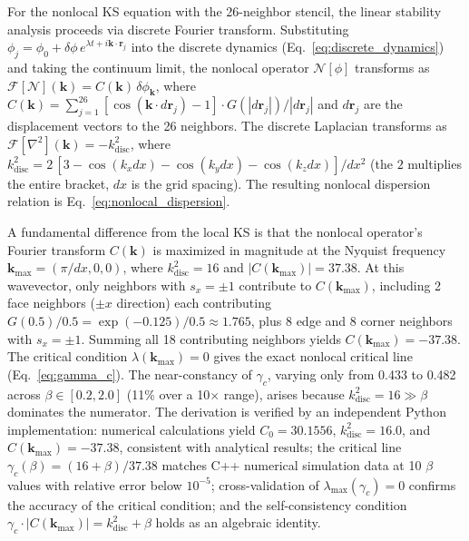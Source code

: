 \documentclass[sn-nature,pdflatex]{sn-jnl}
\begin{document}
For the nonlocal KS equation with the 26-neighbor stencil, the linear stability analysis proceeds via discrete Fourier transform. Substituting $\phi_j = \phi_0 + \delta\phi\, e^{\lambda t + i\mathbf{k}\cdot\mathbf{r}_j}$ into the discrete dynamics (Eq.~\ref{eq:discrete_dynamics}) and taking the continuum limit, the nonlocal operator $\mathcal{N}[\phi]$ transforms as $\mathcal{F}[\mathcal{N}](\mathbf{k}) = C(\mathbf{k})\,\delta\phi_{\mathbf{k}}$, where $C(\mathbf{k}) = \sum_{j=1}^{26} [\cos(\mathbf{k}\cdot d\mathbf{r}_j) - 1] \cdot G(|d\mathbf{r}_j|)/|d\mathbf{r}_j|$ and $d\mathbf{r}_j$ are the displacement vectors to the 26 neighbors. The discrete Laplacian transforms as $\mathcal{F}[\nabla^2](\mathbf{k}) = -k^2_{\text{disc}}$, where $k^2_{\text{disc}} = 2\,[3 - \cos(k_x dx) - \cos(k_y dx) - \cos(k_z dx)]/dx^2$ (the $2$ multiplies the entire bracket, $dx$ is the grid spacing). The resulting nonlocal dispersion relation is Eq.~\ref{eq:nonlocal_dispersion}.

A fundamental difference from the local KS is that the nonlocal operator's Fourier transform $C(\mathbf{k})$ is maximized in magnitude at the Nyquist frequency $\mathbf{k}_{\max} = (\pi/dx, 0, 0)$, where $k^2_{\text{disc}} = 16$ and $|C(\mathbf{k}_{\max})| = 37.38$. At this wavevector, only neighbors with $s_x = \pm 1$ contribute to $C(\mathbf{k}_{\max})$, including 2 face neighbors ($\pm x$ direction) each contributing $G(0.5)/0.5 = \exp(-0.125)/0.5 \approx 1.765$, plus 8 edge and 8 corner neighbors with $s_x = \pm 1$. Summing all 18 contributing neighbors yields $C(\mathbf{k}_{\max}) = -37.38$. The critical condition $\lambda(\mathbf{k}_{\max}) = 0$ gives the exact nonlocal critical line (Eq.~\ref{eq:gamma_c}). The near-constancy of $\gamma_c$, varying only from 0.433 to 0.482 across $\beta \in [0.2, 2.0]$ (11\% over a 10$\times$ range), arises because $k^2_{\text{disc}} = 16 \gg \beta$ dominates the numerator. The derivation is verified by an independent Python implementation: numerical calculations yield $C_0 = 30.1556$, $k^2_{\text{disc}} = 16.0$, and $C(\mathbf{k}_{\max}) = -37.38$, consistent with analytical results; the critical line $\gamma_c(\beta) = (16+\beta)/37.38$ matches C++ numerical simulation data at 10 $\beta$ values with relative error below $10^{-5}$; cross-validation of $\lambda_{\max}(\gamma_c) = 0$ confirms the accuracy of the critical condition; and the self-consistency condition $\gamma_c \cdot |C(\mathbf{k}_{\max})| = k^2_{\text{disc}} + \beta$ holds as an algebraic identity.
\end{document}
